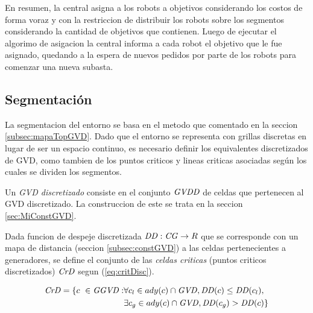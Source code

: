 
En resumen, la central asigna a los robots a objetivos considerando los costos
de forma voraz y con la restriccion de distribuir los robots sobre los
segmentos considerando la cantidad de objetivos que contienen. Luego de
ejecutar el algorimo de asigacion la central informa a cada robot el objetivo
que le fue asignado, quedando a la espera de nuevos pedidos por parte de los
robots para comenzar una nueva subasta. 

\subsection{Segmentación}\label{subsec:mapaTopGVDGrid}

La segmentacion del entorno se basa en el metodo que comentado en la seccion
\ref{subsec:mapaTopGVD}. Dado que el entorno se representa con grillas
discretas en lugar de ser un espacio continuo, es necesario definir los
equivalentes discretizados de GVD, como tambien de los puntos criticos y lineas
criticas asociadas según los cuales se dividen los segmentos.

Un \emph{GVD discretizado} consiste en el conjunto $\mathit{GVDD}$ de celdas que
pertenecen al GVD discretizado. La construccion de este se trata en la seccion
\ref{sec:MiConstGVD}.

Dada funcion de despeje discretizada $\mathit{DD} : \mathit{CG} \rightarrow R$ que se
corresponde con un mapa de distancia (seccion \ref{subsec:constGVD}) a las
celdas pertenecientes a generadores, se define el conjunto de las \emph{celdas
criticas} (puntos criticos discretizados) $\mathit{CrD}$ segun
(\ref{eq:critDisc}). 

\begin{equation}
\begin{split}
  \mli{CrD} = \{c\ \in \mli{GGVD} : & \forall c_l \in ady(c) \cap \mli{GVD}, \mli{DD}(c) \leq \mli{DD}(c_l),\\
                                    & \exists c_g \in ady(c) \cap \mli{GVD}, \mli{DD}(c_g) > \mli{DD}(c) \} %
\end{split}
\label{eq:critDisc}
\end{equation}

